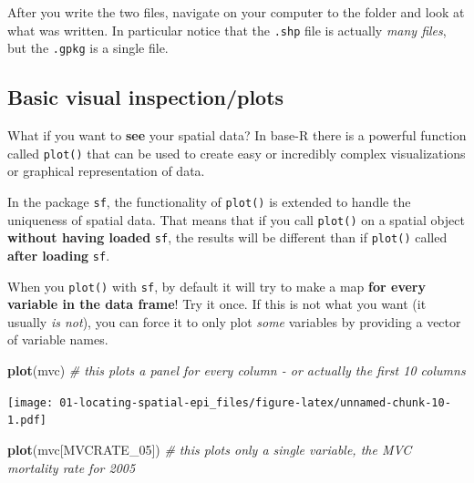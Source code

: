 \documentclass[
]{book}
\newenvironment{Shaded}{\begin{snugshade}}{\end{snugshade}}
\newcommand{\CommentTok}[1]{\textcolor[rgb]{0.56,0.35,0.01}{\textit{#1}}}
\newcommand{\FunctionTok}[1]{\textcolor[rgb]{0.13,0.29,0.53}{\textbf{#1}}}
\newcommand{\NormalTok}[1]{#1}
\newcommand{\StringTok}[1]{\textcolor[rgb]{0.31,0.60,0.02}{#1}}
\newenvironment{rmdnote}[1]
  {
  \begin{itemize}
  \renewcommand{\labelitemi}{
    \raisebox{-.7\height}[0pt][0pt]{
      {\setkeys{Gin}{width=3em,keepaspectratio}\texttt{[image: images/\#1]}}
    }
  }
  \setlength{\fboxsep}{1em}
  \begin{note}
  \item
  }
  {
  \end{note}
  \end{itemize}
  }
\begin{document}
\begin{rmdnote}{note}
After you write the two files, navigate on your computer to the folder and look at what was written. In particular notice that the \texttt{.shp} file is actually \emph{many files}, but the \texttt{.gpkg} is a single file.

\end{rmdnote}

\hypertarget{basic-visual-inspectionplots}{%
\subsection{Basic visual inspection/plots}\label{basic-visual-inspectionplots}}

What if you want to \textbf{see} your spatial data? In base-R there is a powerful function called \texttt{plot()} that can be used to create easy or incredibly complex visualizations or graphical representation of data.

In the package \texttt{sf}, the functionality of \texttt{plot()} is extended to handle the uniqueness of spatial data. That means that if you call \texttt{plot()} on a spatial object \textbf{without having loaded} \texttt{sf}, the results will be different than if \texttt{plot()} called \textbf{after loading} \texttt{sf}.

When you \texttt{plot()} with \texttt{sf}, by default it will try to make a map \textbf{for every variable in the data frame}! Try it once. If this is not what you want (it usually \emph{is not}), you can force it to only plot \emph{some} variables by providing a vector of variable names.

\begin{Shaded}
\begin{Highlighting}[]
\FunctionTok{plot}\NormalTok{(mvc) }\CommentTok{\# this plots a panel for every column {-} or actually the first 10 columns}
\end{Highlighting}
\end{Shaded}

\texttt{[image: 01-locating-spatial-epi\_files/figure-latex/unnamed-chunk-10-1.pdf]}

\begin{Shaded}
\begin{Highlighting}[]
\FunctionTok{plot}\NormalTok{(mvc[}\StringTok{\textquotesingle{}MVCRATE\_05\textquotesingle{}}\NormalTok{]) }\CommentTok{\# this plots only a single variable, the MVC mortality rate for 2005}
\end{Highlighting}
\end{Shaded}
\end{document}
